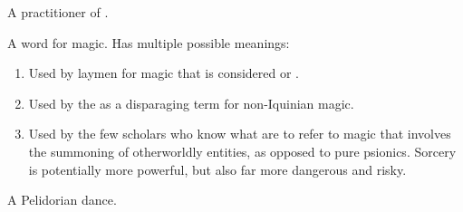 \begin{gloss}
  
  
  \begin{comment}
  \paragraph{sorcerer}
  \end{comment}
  A practitioner of . 
  
  
  
  
  
  \begin{comment}
  \paragraph{sorcery}
  \end{comment}
  A word for magic. 
  Has multiple possible meanings: 
  
  \begin{enumerate}
    \item 
      Used by laymen for magic that is considered  or . 
    \item 
      Used by the  as a disparaging term for non-Iquinian magic. 
    \item 
      Used by the few scholars who know what  are to refer to magic that involves the summoning of otherworldly entities, as opposed to pure psionics. 
      Sorcery is potentially more powerful, but also far more dangerous and risky. 
  \end{enumerate}
  
  
  
  
  
  
  
  \begin{comment}
  \paragraph{tacupien}
  \end{comment}
  A Pelidorian dance.
  
  
  
  
  
  
  
  \begin{comment}
  \subsubsection{V-Z}
  \end{comment}
  
  
  
  
\end{gloss}
















